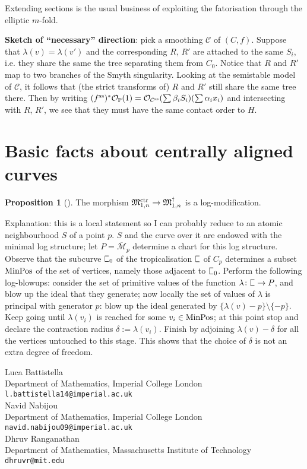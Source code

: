 \documentclass[11pt]{amsart}
\newcommand{\plC}{\scalebox{0.8}[1.3]{$\sqsubset$}}
\newcommand{\oM}{\overline{\mathcal{M}}}
\newcommand{\PP}{\mathbb P}
\newcommand{\OO}{\mathcal{O}}
\renewcommand{\to}{\rightarrow}
\newcommand{\cC}{\mathcal C}
\newcommand{\MM}{\mathfrak M}
\theoremstyle{definition}
\newtheorem{prop}[thm]{Proposition}
\theoremstyle{definition}
\begin{document}
Extending sections is the usual business of exploiting the fatorisation through the elliptic $m$-fold.

\textbf{Sketch of ``necessary'' direction}: pick a smoothing $\cC$ of $(C,f)$. Suppose that $\lambda(v)=\lambda(v')$ and the corresponding $R$, $R'$ are attached to the same $S_i$, i.e. they share the same the tree separating them from $C_0$. Notice that $R$ and $R'$ map to two branches of the Smyth singularity. Looking at the semistable model of $\cC$, it follows that (the strict transforms of) $R$ and $R'$ still share the same tree there. Then by writing $(f^{\rm{ss}})^*\OO_{\PP}(1)=\OO_{\cC^{\rm{ss}}}(\sum \beta_iS_i)(\sum \alpha_ix_i)$ and intersecting with $R$, $R'$, we see that they must have the same contact order to $H$.

\appendix

\section{Basic facts about centrally aligned curves}
\begin{prop}[{\cite[Proposition 4.6.2.2]{RSPW}}]
The morphism $\MM^{\rm{ctr}}_{1,n}\to\MM^{\dagger}_{1,n}$ is a log-modification.
\end{prop}

Explanation: this is a local statement so I can probably reduce to an atomic neighbourhood $S$ of a point $p$. $S$ and the curve over it are endowed with the minimal log structure; let $P=\oM_p$ determine a chart for this log structure. Observe that the subcurve $\plC_0$ of the tropicalisation $\plC$ of $C_p$ determines a subset $\rm{MinPos}$ of the set of vertices, namely those adjacent to $\plC_0$. Perform the following log-blowups: consider the set of primitive values of the function $\lambda\colon \plC\to P$, and blow up the ideal that they generate; now locally the set of values of $\lambda$ is principal with generator $p$: blow up the ideal generated by $\{\lambda(v)-p\}\setminus\{-p\}$. Keep going until $\lambda(v_i)$ is reached for some $v_i\in\rm{MinPos}$; at this point stop and declare the contraction radius $\delta:=\lambda(v_i)$. Finish by adjoining $\lambda(v)-\delta$ for all the vertices untouched to this stage. This shows that the choice of $\delta$ is not an extra degree of freedom.




\bigskip\bigskip

\noindent Luca Battistella\\
Department of Mathematics, Imperial College London \\
\texttt{l.battistella14@imperial.ac.uk}\\

\noindent Navid Nabijou \\
Department of Mathematics, Imperial College London \\
\texttt{navid.nabijou09@imperial.ac.uk}\\

\noindent Dhruv Ranganathan \\
Department of Mathematics, Massachusetts Institute of Technology \\
\texttt{dhruvr@mit.edu}
\end{document}
